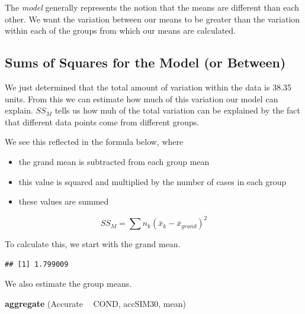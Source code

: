 \documentclass[
  english,
]{book}
\newenvironment{Shaded}{\begin{snugshade}}{\end{snugshade}}
\newcommand{\KeywordTok}[1]{\textcolor[rgb]{0.13,0.29,0.53}{\textbf{#1}}}
\newcommand{\NormalTok}[1]{#1}
\newcommand{\OperatorTok}[1]{\textcolor[rgb]{0.81,0.36,0.00}{\textbf{#1}}}
\newcommand{\StringTok}[1]{\textcolor[rgb]{0.31,0.60,0.02}{#1}}
\providecommand{\tightlist}{%
  \setlength{\itemsep}{0pt}\setlength{\parskip}{0pt}}
\begin{document}
The \emph{model} generally represents the notion that the means are different than each other. We want the variation between our means to be greater than the variation within each of the groups from which our means are calculated.

\hypertarget{sums-of-squares-for-the-model-or-between}{%
\subsection{Sums of Squares for the Model (or Between)}\label{sums-of-squares-for-the-model-or-between}}

We just determined that the total amount of variation within the data is 38.35 units. From this we can estimate how much of this variation our model can explain. \(SS_M\) tells us how muh of the total variation can be explained by the fact that different data points come from different groups.

We see this reflected in the formula below, where

\begin{itemize}
\tightlist
\item
  the grand mean is subtracted from each group mean
\item
  this value is squared and multiplied by the number of cases in each group
\item
  these values are summed
\end{itemize}

\[SS_{M}= \sum n_{k}(\bar{x}_{k}-\bar{x}_{grand})^{2}\]

To calculate this, we start with the grand mean.

\begin{Shaded}
\end{Shaded}

\begin{verbatim}
## [1] 1.799009
\end{verbatim}

We also estimate the group means.

\begin{Shaded}
\begin{Highlighting}[]
\KeywordTok{aggregate}\NormalTok{ (Accurate }\OperatorTok{~}\StringTok{ }\NormalTok{COND, accSIM30, mean)}
\end{Highlighting}
\end{Shaded}
\end{document}
